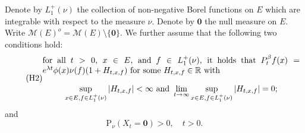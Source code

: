 \documentclass[12pt,a4paper]{amsart}
\numberwithin{equation}{section}
\theoremstyle{plain}
\theoremstyle{definition}
\theoremstyle{remark}
\begin{document}
	Denote by $L_1^+(\nu)$ the collection of non-negative Borel functions on $E$ which are integrable with respect to the measure $\nu$.
	Denote by $\mathbf 0$ the null measure on $E$.
	Write $\mathcal M(E)^o = \mathcal M(E)\setminus \{\mathbf 0\}$.
	We further assume that the following two conditions hold:
\begin{equation} \label{asp:H2} \tag{H2}
\begin{minipage}{0.9\textwidth}
	for all $t>0$, $x\in E$, and $f\in L_1^+(\nu)$, it holds that $P_t^\beta f(x) = e^{\lambda t} \phi(x) \nu(f) (1+ H_{t,x,f})$ for some $H_{t,x,f}\in \mathbb R$ with
\[
	\sup_{x\in E, f\in L_1^+(\nu)} |H_{t,x,f}|
	< \infty
	\text{ and }
	\lim_{t\to \infty} \sup_{x\in E, f\in L_1^+(\nu)} |H_{t,x,f}|
	= 0;
\]
\end{minipage}
\end{equation}
	and
\begin{equation} \label{asp:H3} \tag{H3}
	\mathrm P_\nu(X_t = \mathbf 0)>0, \quad t> 0.
\end{equation}
\end{document}
